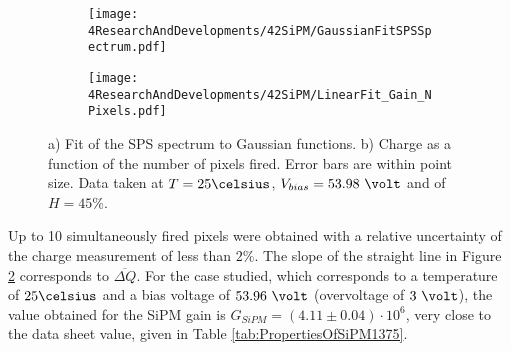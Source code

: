 \begin{figure}
\centering
    \begin{subfigure}[b]{0.9\textwidth}
    \centering
    \texttt{[image: 4ResearchAndDevelopments/42SiPM/GaussianFitSPSSpectrum.pdf]}  
    \caption{\label{subfig:GaussianFitSiPMs}}
    \end{subfigure}
    \hfill
    \begin{subfigure}[b]{0.9\textwidth}
    \centering
    \texttt{[image: 4ResearchAndDevelopments/42SiPM/LinearFit\_Gain\_NPixels.pdf]}  
    \caption{\label{subfig:LinearFitSiPMGain}}
    \end{subfigure}
 \caption{a) Fit of the SPS spectrum to Gaussian functions. b) Charge as a function of the number of pixels fired. Error bars are within point size. Data taken at $T=25\celsius$, $V_{bias}=53.98~\volt$ and of $H=45\%$.}
 \label{fig:ROOTAnalysisSiPMGain}
\end{figure}
Up to 10 simultaneously fired pixels were obtained with a relative uncertainty of the charge measurement of less than $2\%$. The slope of the straight line in Figure \ref{subfig:LinearFitSiPMGain} corresponds to $\overline{\Delta Q}$.
For the case studied, which corresponds to a temperature of $25\celsius$ and a bias voltage of $53.96~\volt$ (overvoltage of $3~\volt$), the value obtained for the SiPM gain is $G_{SiPM}=(4.11 \pm 0.04) \cdot{} 10^{6}$, very close to the data sheet value, given in Table \ref{tab:PropertiesOfSiPM1375}.

